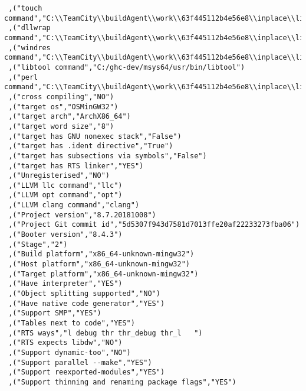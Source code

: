 \begin{verbatim}
 ,("touch command","C:\\TeamCity\\buildAgent\\work\\63f445112b4e56e8\\inplace\\lib/bin/touchy.exe")
 ,("dllwrap command","C:\\TeamCity\\buildAgent\\work\\63f445112b4e56e8\\inplace\\lib\\../mingw/bin/dllwrap.exe")
 ,("windres command","C:\\TeamCity\\buildAgent\\work\\63f445112b4e56e8\\inplace\\lib\\../mingw/bin/windres.exe")
 ,("libtool command","C:/ghc-dev/msys64/usr/bin/libtool")
 ,("perl command","C:\\TeamCity\\buildAgent\\work\\63f445112b4e56e8\\inplace\\lib\\../perl/perl.exe")
 ,("cross compiling","NO")
 ,("target os","OSMinGW32")
 ,("target arch","ArchX86_64")
 ,("target word size","8")
 ,("target has GNU nonexec stack","False")
 ,("target has .ident directive","True")
 ,("target has subsections via symbols","False")
 ,("target has RTS linker","YES")
 ,("Unregisterised","NO")
 ,("LLVM llc command","llc")
 ,("LLVM opt command","opt")
 ,("LLVM clang command","clang")
 ,("Project version","8.7.20181008")
 ,("Project Git commit id","5d5307f943d7581d7013ffe20af22233273fba06")
 ,("Booter version","8.4.3")
 ,("Stage","2")
 ,("Build platform","x86_64-unknown-mingw32")
 ,("Host platform","x86_64-unknown-mingw32")
 ,("Target platform","x86_64-unknown-mingw32")
 ,("Have interpreter","YES")
 ,("Object splitting supported","NO")
 ,("Have native code generator","YES")
 ,("Support SMP","YES")
 ,("Tables next to code","YES")
 ,("RTS ways","l debug thr thr_debug thr_l   ")
 ,("RTS expects libdw","NO")
 ,("Support dynamic-too","NO")
 ,("Support parallel --make","YES")
 ,("Support reexported-modules","YES")
 ,("Support thinning and renaming package flags","YES")

\end{verbatim}
